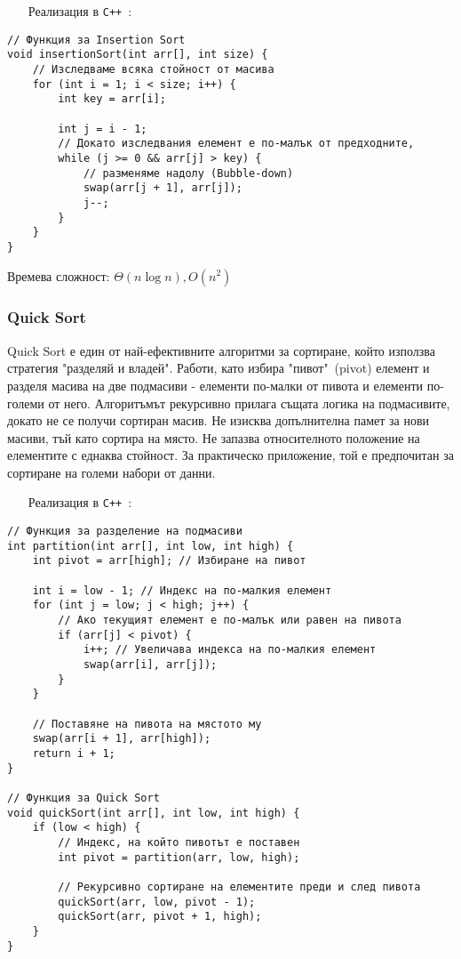 \documentclass[oneside]{book}
\newcommand*{\cpp}{\texttt{C++}\ }
\begin{document}
\begin{itemize}\item[Реализация] в \cpp:\end{itemize}
\begin{mdframed}\begin{lstlisting}
// Функция за Insertion Sort
void insertionSort(int arr[], int size) {
    // Изследваме всяка стойност от масива
    for (int i = 1; i < size; i++) {
        int key = arr[i];

        int j = i - 1;
        // Докато изследвания елемент е по-малък от предходните,
        while (j >= 0 && arr[j] > key) {
            // разменяме надолу (Bubble-down)
            swap(arr[j + 1], arr[j]);
            j--;
        }
    }
}
\end{lstlisting}\end{mdframed}

Времева сложност: $\Theta(n\log n), O(n^2)$

\subsubsection{Quick Sort}
Quick Sort е един от най-ефективните алгоритми за сортиране, който използва стратегия "разделяй и владей".
Работи, като избира "пивот"\ (pivot) елемент и разделя масива на две подмасиви - елементи по-малки от пивота и елементи по-големи от него.
Алгоритъмът рекурсивно прилага същата логика на подмасивите, докато не се получи сортиран масив.
Не изисква допълнителна памет за нови масиви, тъй като сортира на място.
Не запазва относителното положение на елементите с еднаква стойност.
За практическо приложение, той е предпочитан за сортиране на големи набори от данни.
\pagebreak
\begin{itemize}\item[Реализация] в \cpp:\end{itemize}
\begin{mdframed}\begin{lstlisting}
// Функция за разделение на подмасиви
int partition(int arr[], int low, int high) {
    int pivot = arr[high]; // Избиране на пивот

    int i = low - 1; // Индекс на по-малкия елемент
    for (int j = low; j < high; j++) {
        // Ако текущият елемент е по-малък или равен на пивота
        if (arr[j] < pivot) {
            i++; // Увеличава индекса на по-малкия елемент
            swap(arr[i], arr[j]);
        }
    }

    // Поставяне на пивота на мястото му
    swap(arr[i + 1], arr[high]);
    return i + 1;
}

// Функция за Quick Sort
void quickSort(int arr[], int low, int high) {
    if (low < high) {
        // Индекс, на който пивотът е поставен
        int pivot = partition(arr, low, high);

        // Рекурсивно сортиране на елементите преди и след пивота
        quickSort(arr, low, pivot - 1);
        quickSort(arr, pivot + 1, high);
    }
}
\end{lstlisting}\end{mdframed}
\end{document}
